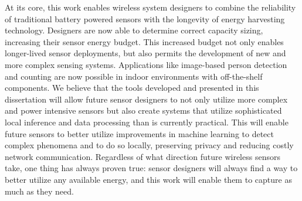 At its core, this work enables wireless system designers to combine the reliability of traditional battery powered sensors with the longevity of energy harvesting technology.
Designers are now able to determine correct capacity sizing, increasing their sensor energy budget.
This increased budget not only enables longer-lived sensor deployments, but also permits the development of new and more complex sensing systems.
Applications like image-based person detection and counting are now possible in indoor environments with off-the-shelf components. 
We believe that the tools developed and presented in this dissertation will allow future sensor designers to not only utilize more complex and power intensive sensors but also create systems that utilize sophisticated local inference and data processing than is currently practical.
This will enable future sensors to better utilize improvements in machine learning to detect complex phenomena and to do so locally, preserving privacy and reducing costly network communication.
Regardless of what direction future wireless sensors take, one thing has always proven true: sensor designers will always find a way to better utilize any available energy, and this work will enable them to capture as much as they need. 

